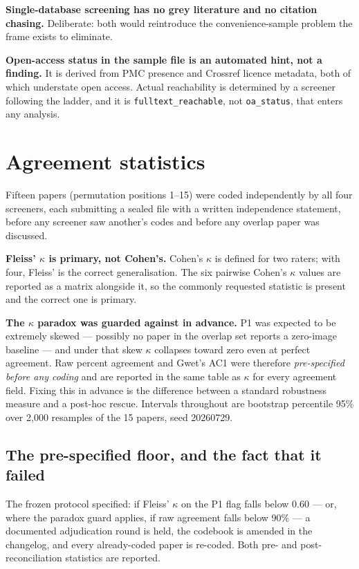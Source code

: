 \documentclass[11pt,a4paper]{article}
\begin{document}
\textbf{Single-database screening has no grey literature and no citation chasing.}
Deliberate: both would reintroduce the convenience-sample problem the frame exists to
eliminate.

\textbf{Open-access status in the sample file is an automated hint, not a finding.} It
is derived from PMC presence and Crossref licence metadata, both of which understate
open access. Actual reachability is determined by a screener following the ladder, and
it is \texttt{fulltext\_reachable}, not \texttt{oa\_status}, that enters any analysis.

\clearpage
\section{Agreement statistics}

Fifteen papers (permutation positions 1--15) were coded independently by all four
screeners, each submitting a sealed file with a written independence statement,
before any screener saw another's codes and before any overlap paper was discussed.

\textbf{Fleiss' $\kappa$ is primary, not Cohen's.} Cohen's $\kappa$ is defined for two
raters; with four, Fleiss' is the correct generalisation. The six pairwise Cohen's
$\kappa$ values are reported as a matrix alongside it, so the commonly requested
statistic is present and the correct one is primary.

\textbf{The $\kappa$ paradox was guarded against in advance.} P1 was expected to be
extremely skewed --- possibly no paper in the overlap set reports a zero-image
baseline --- and under that skew $\kappa$ collapses toward zero even at perfect
agreement. Raw percent agreement and Gwet's AC1 were therefore \emph{pre-specified
before any coding} and are reported in the same table as $\kappa$ for every agreement
field. Fixing this in advance is the difference between a standard robustness measure
and a post-hoc rescue. Intervals throughout are bootstrap percentile 95\% over 2{,}000
resamples of the 15 papers, seed 20260729.

\subsection{The pre-specified floor, and the fact that it failed}

The frozen protocol specified: if Fleiss' $\kappa$ on the P1 flag falls below 0.60 ---
or, where the paradox guard applies, if raw agreement falls below 90\% --- a
documented adjudication round is held, the codebook is amended in the changelog, and
every already-coded paper is re-coded. Both pre- and post-reconciliation statistics
are reported.
\end{document}
